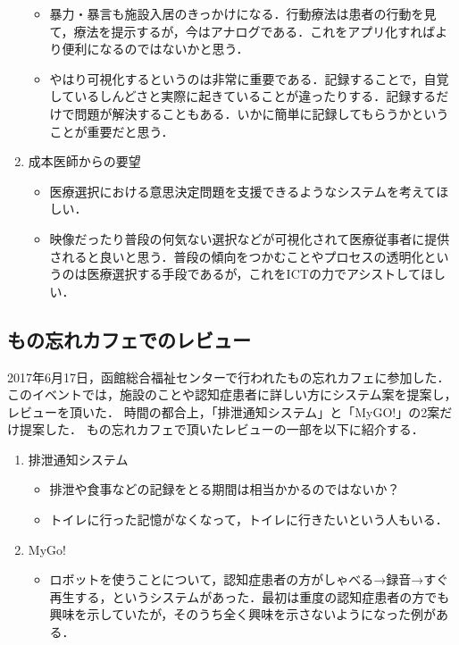 \documentclass[../report]{subfiles}
\begin{document}
\begin{enumerate}
\begin{itemize}
            \item 暴力・暴言も施設入居のきっかけになる．行動療法は患者の行動を見て，療法を提示するが，今はアナログである．これをアプリ化すればより便利になるのではないかと思う．
            \item やはり可視化するというのは非常に重要である．記録することで，自覚しているしんどさと実際に起きていることが違ったりする．記録するだけで問題が解決することもある．いかに簡単に記録してもらうかということが重要だと思う．
        \end{itemize}
   \item 成本医師からの要望
        \begin{itemize}
            \item 医療選択における意思決定問題を支援できるようなシステムを考えてほしい．
            \item 映像だったり普段の何気ない選択などが可視化されて医療従事者に提供されると良いと思う．普段の傾向をつかむことやプロセスの透明化というのは医療選択する手段であるが，これをICTの力でアシストしてほしい．
        \end{itemize}
\end{enumerate}

\subsection{もの忘れカフェでのレビュー}\label{sec:review-monowasurecafe}
2017年6月17日，函館総合福祉センターで行われたもの忘れカフェに参加した．
このイベントでは，施設のことや認知症患者に詳しい方にシステム案を提案し，レビューを頂いた．
時間の都合上，「排泄通知システム」と「MyGO!」の2案だけ提案した．
もの忘れカフェで頂いたレビューの一部を以下に紹介する．
\begin{enumerate}
    \item 排泄通知システム
        \begin{itemize}
            \item 排泄や食事などの記録をとる期間は相当かかるのではないか？
            \item トイレに行った記憶がなくなって，トイレに行きたいという人もいる．
        \end{itemize}
    \item MyGo!
        \begin{itemize}
            \item ロボットを使うことについて，認知症患者の方がしゃべる→録音→すぐ再生する，というシステムがあった．最初は重度の認知症患者の方でも興味を示していたが，そのうち全く興味を示さないようになった例がある．
        \end{itemize}
\end{enumerate}
\end{document}
